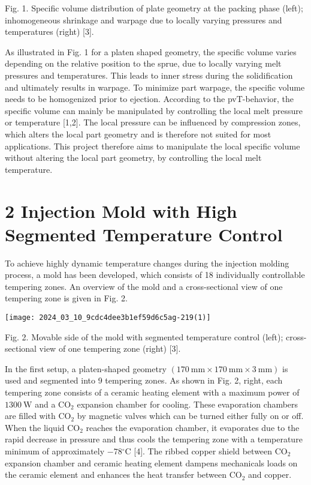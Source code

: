 \documentclass[10pt]{article}
\begin{document}
Fig. 1. Specific volume distribution of plate geometry at the packing phase (left); inhomogeneous shrinkage and warpage due to locally varying pressures and temperatures (right) [3].

As illustrated in Fig. 1 for a platen shaped geometry, the specific volume varies depending on the relative position to the sprue, due to locally varying melt pressures and temperatures. This leads to inner stress during the solidification and ultimately results in warpage. To minimize part warpage, the specific volume needs to be homogenized prior to ejection. According to the pvT-behavior, the specific volume can mainly be manipulated by controlling the local melt pressure or temperature [1,2]. The local pressure can be influenced by compression zones, which alters the local part geometry and is therefore not suited for most applications. This project therefore aims to manipulate the local specific volume without altering the local part geometry, by controlling the local melt temperature.

\section*{2 Injection Mold with High Segmented Temperature Control}
To achieve highly dynamic temperature changes during the injection molding process, a mold has been developed, which consists of 18 individually controllable tempering zones. An overview of the mold and a cross-sectional view of one tempering zone is given in Fig. 2.

\begin{center}
\texttt{[image: 2024\_03\_10\_9cdc4dee3b1ef59d6c5ag-219(1)]}
\end{center}

Fig. 2. Movable side of the mold with segmented temperature control (left); cross-sectional view of one tempering zone (right) [3].

In the first setup, a platen-shaped geometry $(170 \mathrm{~mm} \times 170 \mathrm{~mm} \times 3 \mathrm{~mm})$ is used and segmented into 9 tempering zones. As shown in Fig. 2, right, each tempering zone consists of a ceramic heating element with a maximum power of $1300 \mathrm{~W}$ and a $\mathrm{CO}_{2}$ expansion chamber for cooling. These evaporation chambers are filled with $\mathrm{CO}_{2}$ by magnetic valves which can be turned either fully on or off. When the liquid $\mathrm{CO}_{2}$ reaches the evaporation chamber, it evaporates due to the rapid decrease in pressure and thus cools the tempering zone with a temperature minimum of approximately $-78{ }^{\circ} \mathrm{C}$ [4]. The ribbed copper shield between $\mathrm{CO}_{2}$ expansion chamber and ceramic heating element dampens mechanicals loads on the ceramic element and enhances the heat transfer between $\mathrm{CO}_{2}$ and copper.
\end{document}
